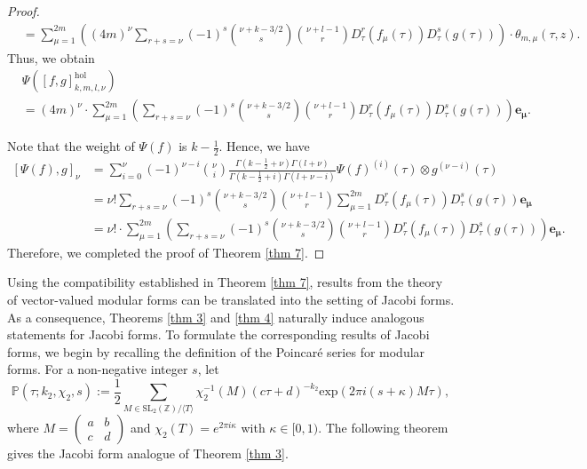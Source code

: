 \documentclass[11pt]{amsart}
\theoremstyle{definition}
\theoremstyle{remark}
\numberwithin{equation}{section}
\newcommand{\sm}{\left(\begin{smallmatrix}}
\newcommand{\esm}{\end{smallmatrix}\right)}
\renewcommand{\(}{\left(}
\renewcommand{\)}{\right)}
\begin{document}
\begin{proof}
\begin{equation*}
\begin{aligned}
            &=\sum_{\mu=1}^{2m}\left((4m)^{\nu}\sum_{r+s=\nu}(-1)^{s}\binom{\nu+k-3/2}{s}\binom{\nu+l-1}{r} D_{\tau}^{r}(f_{\mu}(\tau))D_{\tau}^{s}(g(\tau))\right)\cdot \theta_{m,\mu}(\tau,z).
        \end{aligned}
    \end{equation*}
    Thus, we obtain 
    \begin{equation*}
        \begin{aligned}
            &\Psi\left([f,g]^{\mathrm{hol}}_{k,m,l,\nu}\right)\\
            &= (4m)^{\nu}\cdot\sum_{\mu=1}^{2m}\left(\sum_{r+s=\nu}(-1)^{s}\binom{\nu+k-3/2}{s}\binom{\nu+l-1}{r} D_{\tau}^{r}(f_{\mu}(\tau))D_{\tau}^{s}(g(\tau))\right)\mathbf{e_{\mu}}.
        \end{aligned}
    \end{equation*}

    Note that the weight of $\Psi(f)$ is $k-\frac{1}{2}$. 
    Hence, we have
    \begin{equation*}
        \begin{aligned}
            [\Psi(f),g]_{\nu}&=\sum_{i=0}^{\nu} (-1)^{\nu-i} \binom{\nu}{i}\frac{\Gamma(k-\frac{1}{2}+\nu)\Gamma(l+\nu)}{\Gamma(k-\frac{1}{2}+i)\Gamma(l+\nu-i)}\Psi(f)^{(i)}(\tau)\otimes g^{(\nu-i)}(\tau)\\
            &=\nu!\sum_{r+s=\nu} (-1)^{s} \binom{\nu+k-3/2}{s}\binom{\nu+l-1}{r} \sum_{\mu=1}^{2m} D_{\tau}^{r}(f_{\mu}(\tau))D_{\tau}^{s}(g(\tau)) \mathbf{e_{\mu}}\\
            &=\nu!\cdot\sum_{\mu=1}^{2m}\left(\sum_{r+s=\nu} (-1)^{s} \binom{\nu+k-3/2}{s}\binom{\nu+l-1}{r}  D_{\tau}^{r}(f_{\mu}(\tau))D_{\tau}^{s}(g(\tau))\right)\mathbf{e_{\mu}}.
        \end{aligned}
    \end{equation*}
    Therefore, we completed the proof of Theorem \ref{thm 7}.
\end{proof}

Using the compatibility established in Theorem \ref{thm 7}, results from the theory of vector-valued modular forms can be translated into the setting of Jacobi forms.
As a consequence, Theorems \ref{thm 3} and \ref{thm 4} naturally induce analogous statements for Jacobi forms.
To formulate the corresponding results of Jacobi forms, we begin by recalling the definition of the Poincaré series for modular forms.
 For a non-negative integer $s$, let 
    \[ \mathbb{P}(\tau;k_2,\chi_2,s):=\frac{1}{2} \sum_{M\in \mathrm{SL}_{2}(\mathbb{Z})/\langle T \rangle } \chi_2^{-1}(M)(c\tau+d)^{-k_2}\mathrm{exp}(2\pi i(s+\kappa)M\tau), \]
    where $M=\sm a & b\\
    c & d \esm$ and $\chi_2(T)=e^{2\pi i \kappa}$ with $\kappa\in [0,1)$.
The following theorem gives the Jacobi form analogue of Theorem \ref{thm 3}.
    
\end{document}
